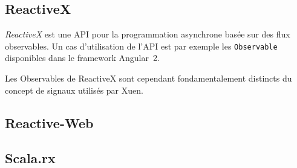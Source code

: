 \subsection{ReactiveX}

\emph{ReactiveX} est une API pour la programmation asynchrone basée sur des flux observables. Un cas d'utilisation de l'API est par exemple les \texttt{Observable} disponibles dans le framework Angular~2.

Les Observables de ReactiveX sont cependant fondamentalement distincts du concept de signaux utilisés par Xuen.

\subsection{Reactive-Web}
\subsection{Scala.rx}